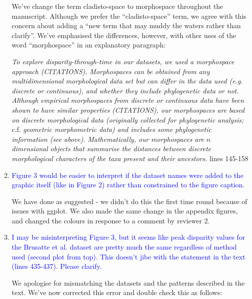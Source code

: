 \documentclass[12pt,letterpaper]{article}
\begin{document}
\begin{enumerate}
We've change the term cladisto-space to morphospace throughout the manuscript.
Although we prefer the ``cladisto-space'' term, we agree with this concern about adding a ``new term that may muddy the waters rather than clarify''.
We've emphasised the differences, however, with other uses of the word ``morphospace'' in an explanatory paragraph:

\textit{To explore disparity-through-time in our datasets, we used a morphospace approach (CITATIONS).
Morphospaces can be obtained from any multidimensional morphological data set but can differ in the data used (e.g. discrete or continuous), and whether they include phylogenetic data or not. 
Although empirical morphospaces from discrete or continuous data have been shown to have similar properties (CITATIONS), our morphospaces are based on discrete morphological data (originally collected for phylogenetic analysis;} c.f. \textit{geometric morphometric data) and includes some phylogenetic information (see above).
Mathematically, our morphospaces are $n$ dimensional objects that summarise the distances between discrete morphological characters of the taxa present and their ancestors.} lines 145-158

\item{\textcolor{blue}{Figure 3 would be easier to interpret if the dataset names were added to the graphic itself (like in Figure 2) rather than constrained to the figure caption.}}

We have done as suggested - we didn't do this the first time round because of issues with ggplot. We also made the same change in the appendix figures, and changed the colours in response to a comment by reviewer 2.


\item{\textcolor{blue}{I may be misinterpreting Figure 3, but it seems like peak disparity values for the Brusatte et al. dataset are pretty much the same regardless of method used (second plot from top). This doesn't jibe with the statement in the text (lines 435-437). Please clarify.}}
\label{fig3_feckup}

We apologise for mismatching the datasets and the patterns described in the text.
We've now corrected this error and double check this as follows:


\end{enumerate}
\end{document}
